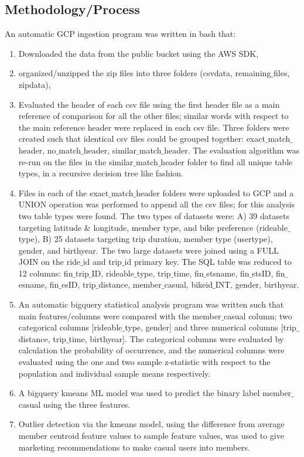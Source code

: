 \documentclass[11pt, onecolumn]{article}
\begin{document}
\subsection{Methodology/Process}
An automatic GCP ingestion program was written in bash that: 
\begin{enumerate}
\item Downloaded the data from the public bucket using the AWS SDK,
\item organized/unzipped the zip files into three folders (csvdata, remaining$\_$files, zipdata),
\item Evaluated the header of each csv file using the first header file as a main reference of comparison for all the other files; similar words with respect to the main reference header were replaced in each csv file. Three folders were created such that identical csv files could be grouped together: exact$\_$match$\_$header, no$\_$match$\_$header, similar$\_$match$\_$header. The evaluation algorithm was re-run on the files in the similar$\_$match$\_$header folder to find all unique table types, in a recursive decision tree like fashion.
\item Files in each of the exact$\_$match$\_$header folders were uploaded to GCP and a UNION operation was performed to append all the csv files; for this analysis two table types were found. The two types of datasets were: A) 39 datasets targeting latitude \& longitude, member type, and bike preference (rideable$\_$type), B) 25 datasets targeting trip duration, member type (usertype), gender, and birthyear. The two large datasets were joined using a FULL JOIN on the ride$\_$id and trip$\_$id primary key. The SQL table was reduced to 12 columns: fin$\_$trip$\_$ID, rideable$\_$type, trip$\_$time, fin$\_$stsname, fin$\_$stsID, fin$\_$esname, fin$\_$esID, trip$\_$distance, member$\_$casual, bikeid$\_$INT, gender, birthyear. 
\item An automatic bigquery statistical analysis program was written such that main features/columns were compared with the member$\_$casual column; two categorical columns [rideable$\_$type, gender] and three numerical columns [trip$\_$distance, trip$\_$time, birthyear]. The categorical columns were evaluated by calculation the probability of occurrence, and the numerical columns were evaluated using the one and two sample z-statistic with respect to the population and individual sample means respectively.
\item A bigquery kmeans ML model was used to predict the binary label member$\_$casual using the three features.
\item  Outlier detection via the kmeans model, using the difference from average member centroid feature values to sample feature values, was used to give marketing recommendations to make casual users into members. 
\end{enumerate}
\end{document}
